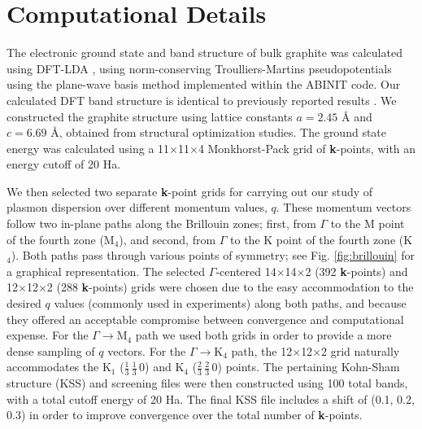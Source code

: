 \documentclass[aps,prb,10pt,showpacs,superscriptaddress,twocolumn,notitlepage]{revtex4-1}
\begin{document}

\section{Computational Details}\label{sec:comp}

The electronic ground state and band structure of bulk graphite was calculated
using DFT-LDA \cite{hohenbergPR64, kohnPR65}, using norm-conserving
Troulliers-Martins pseudopotentials \cite{troullierPRB91} using the plane-wave
basis method implemented within the ABINIT\cite{gonzeCPS09, abinit} code. Our
calculated DFT band structure is identical to previously reported results
\cite{marinopoulosPRB04}. We constructed the graphite structure using lattice
constants $a = 2.45$ \r{A} and $c = 6.69$ \r{A}, obtained from structural
optimization studies. The ground state energy was calculated using a
11$\times$11$\times$4 Monkhorst-Pack grid of \textbf{k}-points, with an energy
cutoff of 20 Ha.

We then selected two separate \textbf{k}-point grids for carrying out our study
of plasmon dispersion over different momentum values, $q$. These momentum
vectors follow two in-plane paths along the Brillouin zones; first, from
$\Gamma$ to the M point of the fourth zone (M$_{4}$), and second, from $\Gamma$
to the K point of the fourth zone (K$_{4}$). Both paths pass through various
points of symmetry; see Fig. \ref{fig:brillouin} for a graphical representation.
The selected $\Gamma$-centered 14$\times$14$\times$2 (392 \textbf{k}-points) and
12$\times$12$\times$2 (288 \textbf{k}-points) grids were chosen due to the easy
accommodation to the desired $q$ values (commonly used in experiments) along
both paths, and because they offered an acceptable compromise between
convergence and computational expense. For the $\Gamma \rightarrow
\mathrm{M_{4}}$ path we used both grids in order to provide a more dense
sampling of $q$ vectors. For the $\Gamma \rightarrow \mathrm{K_{4}}$ path, the
12$\times$12$\times$2 grid naturally accommodates the K$_{1}$
($\frac{1}{3}\,\frac{1}{3}\,0$) and K$_{4}$ ($\frac{2}{3}\,\frac{2}{3}\,0$)
points. The pertaining Kohn-Sham structure (KSS) and screening files were then
constructed using 100 total bands, with a total cutoff energy of 20 Ha. The
final KSS file includes a shift of (0.1, 0.2, 0.3) in order to improve
convergence over the total number of \textbf{k}-points.
\end{document}
